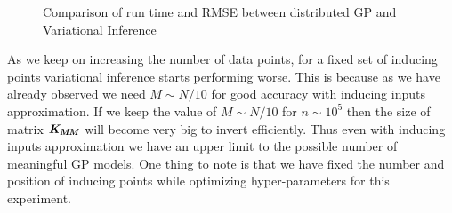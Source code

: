 \begin{figure}[!ht]
  \centering
  \quad
  \caption{Comparison of run time and RMSE between distributed GP and Variational Inference}\label{fig:comparisonOfDGPvsVARGP}
\end{figure}

As we keep on increasing the number of data points, for a fixed set of inducing points variational inference starts performing worse. This is because as we have already observed we need $M \sim N/10$ for good accuracy with inducing inputs approximation. If we keep the value of $M \sim N/10$ for $n \sim 10^5$ then the size of matrix $\bm{\mathit{K_{MM}}}$ will become very big to invert efficiently. Thus even with inducing inputs approximation we have an upper limit to the possible number of meaningful GP models. One thing to note is that we have fixed the number and position of inducing points while optimizing hyper-parameters for this experiment. 



